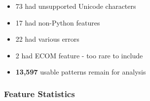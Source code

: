 {\begin{frame}
\begin{itemize}
\item [] \begin{footnotesize}73 had unsupported Unicode characters\end{footnotesize}
\item [] \begin{footnotesize}17 had non-Python features\end{footnotesize}
\item [] \begin{footnotesize}22 had various errors\end{footnotesize}
\item [] \begin{footnotesize}2 had ECOM feature - too rare to include\end{footnotesize}
\item [] \textbf{13,597} usable patterns remain for analysis
\end{itemize}
\end{frame}
}






\begin{frame}[fragile]
\frametitle{Feature Statistics}

\end{frame}



